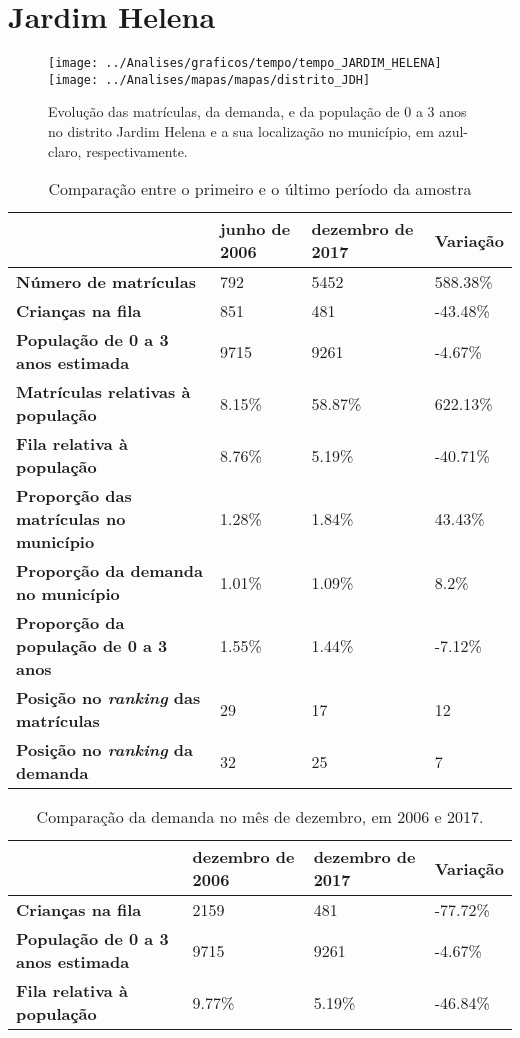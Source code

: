 \section{Jardim Helena}
\begin{figure}[H]
\centering
\texttt{[image: ../Analises/graficos/tempo/tempo\_JARDIM\_HELENA]}
\texttt{[image: ../Analises/mapas/mapas/distrito\_JDH]}
\caption{Evolução das matrículas, da demanda, e da população de 0 a 3 anos no distrito Jardim Helena e a sua localização no município, em azul-claro, respectivamente.}
\end{figure}
\begin{table}[H]
\begin{tabular}{l|l|l|l}
\textbf{}                                      & \textbf{junho de 2006}       & \textbf{dezembro de 2017}    & \textbf{Variação} \\ \hline
\textbf{Número de matrículas}                  & 792 & 5452 & 588.38\% \\ \hline
\textbf{Crianças na fila}                      & 851 & 481 & -43.48\% \\ \hline
\textbf{População de 0 a 3 anos estimada}      & 9715 & 9261 & -4.67\% \\ \hline
\textbf{Matrículas relativas à população}      & 8.15\% & 58.87\% & 622.13\% \\ \hline
\textbf{Fila relativa à população}             & 8.76\% & 5.19\% & -40.71\% \\ \hline
\textbf{Proporção das matrículas no município} & 1.28\% & 1.84\% & 43.43\% \\ \hline
\textbf{Proporção da demanda no município}     & 1.01\% & 1.09\% & 8.2\% \\ \hline
\textbf{Proporção da população de 0 a 3 anos}  & 1.55\% & 1.44\% & -7.12\% \\ \hline
\textbf{Posição no \textit{ranking} das matrículas}     & 29 & 17 & 12 \\ \hline
\textbf{Posição no \textit{ranking} da demanda}         & 32 & 25 & 7 \\ 
\end{tabular}
\caption{Comparação entre o primeiro e o último período da amostra}
\end{table}
\begin{table}[H]
\begin{tabular}{l|l|l|l}
\textbf{}                                 & \textbf{dezembro de 2006} & \textbf{dezembro de 2017} & \textbf{Variação} \\ \hline
\textbf{Crianças na fila}                      & 2159 & 481 & -77.72\% \\ \hline
\textbf{População de 0 a 3 anos estimada}      & 9715 & 9261 & -4.67\% \\ \hline
\textbf{Fila relativa à população}             & 9.77\% & 5.19\% & -46.84\% \\
\end{tabular}
\caption{Comparação da demanda no mês de dezembro, em 2006 e 2017.}
\end{table}
